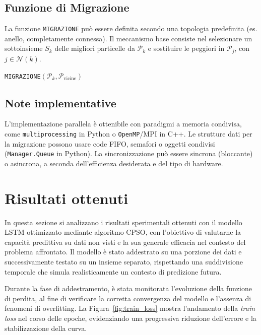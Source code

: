 \documentclass{article}
\begin{document}
\subsection{Funzione di Migrazione}

La funzione \texttt{MIGRAZIONE} può essere definita secondo una topologia predefinita 
(es. anello, completamente connessa). Il meccanismo base consiste nel selezionare un sottoinsieme $S_k$ 
delle migliori particelle da $\mathcal{P}_k$ e sostituire le peggiori in $\mathcal{P}_j$, con $j \in \mathcal{N}(k)$.

\begin{algorithm}[H]
\caption{\texttt{MIGRAZIONE}$(\mathcal{P}_k, \mathcal{P}_{\text{vicine}})$}
\end{algorithm}

\subsection{Note implementative}

L'implementazione parallela è ottenibile con paradigmi a memoria condivisa, come 
\texttt{multiprocessing} in Python o \texttt{OpenMP}/MPI in C++. Le strutture dati per la migrazione 
possono usare code FIFO, semafori o oggetti condivisi (\texttt{Manager.Queue} in Python). 
La sincronizzazione può essere sincrona (bloccante) o asincrona, a seconda dell’efficienza desiderata e 
del tipo di hardware.

\section{Risultati ottenuti}

In questa sezione si analizzano i risultati sperimentali ottenuti con il modello LSTM ottimizzato 
mediante algoritmo CPSO, con l’obiettivo di valutarne la capacità predittiva su dati non visti e la sua 
generale efficacia nel contesto del problema affrontato. Il modello è stato addestrato su una porzione 
dei dati e successivamente testato su un insieme separato, rispettando una suddivisione temporale che 
simula realisticamente un contesto di predizione futura.

Durante la fase di addestramento, è stata monitorata l’evoluzione della funzione di perdita, al fine di 
verificare la corretta convergenza del modello e l’assenza di fenomeni di overfitting. 
La Figura~\ref{fig:train_loss} mostra l’andamento della \textit{train loss} nel corso delle epoche, 
evidenziando una progressiva riduzione dell’errore e la stabilizzazione della curva.
\end{document}
